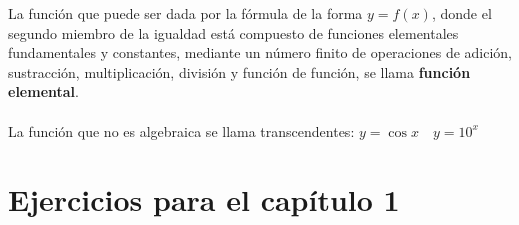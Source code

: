     \begin{tcolorbox}[colframe = white]
	\begin{def.}
	   La función que puede ser dada por la fórmula de la forma $y=f(x)$, donde el segundo miembro de la igualdad está compuesto de funciones elementales fundamentales y constantes, mediante un número finito de operaciones de adición, sustracción, multiplicación, división y función de función, se llama \textbf{función elemental}.\\\\ 
	   La función que no es algebraica se llama transcendentes: $y=\cos x \quad y=10^x$\\
	\end{def.}
    \end{tcolorbox}

\section{Ejercicios para el capítulo 1}

